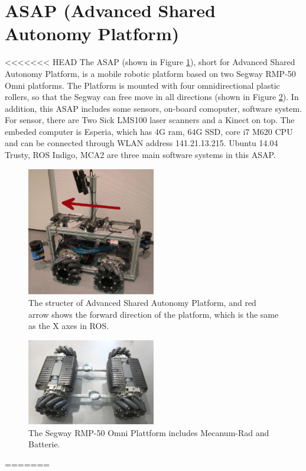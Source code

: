 \section{ASAP (Advanced Shared Autonomy Platform)}
<<<<<<< HEAD
The ASAP (shown in Figure \ref{ASAP}), short for Advanced Shared Autonomy Platform, is a mobile robotic platform based on two Segway RMP-50 Omni platforms. The Platform is mounted with four omnidirectional plastic rollers, so that the Segway can free move in all directions (shown in Figure \ref{Omni}). In addition, this ASAP includes some sensors, on-board comoputer, software system. For sensor, there are Two Sick LMS100 laser scanners and a Kinect on top. The embeded computer is Esperia, which has 4G ram, 64G SSD, core i7 M620 CPU and can be connected through WLAN address 141.21.13.215. Ubuntu 14.04 Trusty, ROS Indigo, MCA2 are three main software systems in this ASAP.

\begin{figure}[thpb]
      \centering
      \includegraphics[width=0.5\textwidth]{graphics/ASAP.png}
      \caption{The structer of Advanced Shared Autonomy Platform, and red arrow shows the forward direction of the platform, which is the same as the X axes in ROS.}
      \label{ASAP}
   \end{figure}

\begin{figure}[thpb]
      \centering
      \includegraphics[width=0.5\textwidth]{graphics/SegwayPlattform.png}
      \caption{The Segway RMP-50 Omni Plattform includes Mecanum-Rad and Batterie.}
      \label{Omni}
   \end{figure}
=======

